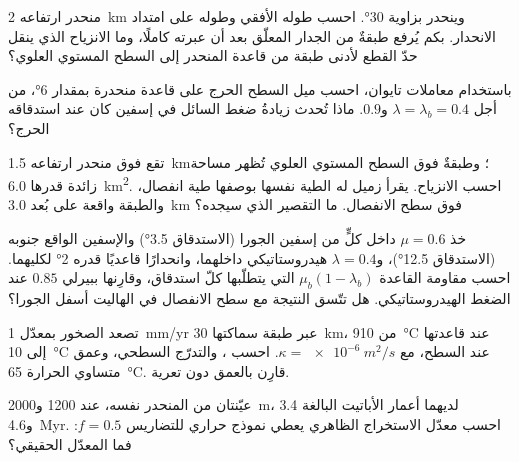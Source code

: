 \begin{exercise}[$\star$]\label{exo:b3:orogenic-wedges:4}
منحدر ارتفاعه \qty{2}{km} وينحدر بزاوية \ang{30}. احسب طوله الأفقي
وطوله على امتداد الانحدار. بكم يُرفع طبقةٌ من الجدار المعلّق بعد أن
عبرته كاملًا، وما الانزياح الذي ينقل حدّ القطع لأدنى
طبقة من قاعدة المنحدر إلى السطح المستوي العلوي؟
\end{exercise}

\begin{exercise}[$\star\star$]\label{exo:b3:orogenic-wedges:5}
باستخدام معاملات تايوان، احسب ميل السطح الحرج على قاعدة
منحدرة بمقدار \ang{6}، من أجل $\lambda = \lambda_b = 0.4$ و$0.9$. ماذا تُحدث
زيادةُ ضغط السائل في إسفين كان عند استدقاقه الحرج؟
\end{exercise}

\begin{exercise}[$\star\star$]\label{exo:b3:orogenic-wedges:6}
 تقع فوق منحدر ارتفاعه \qty{1.5}{km}؛ وطبقةٌ فوق
السطح المستوي العلوي تُظهر مساحة زائدة قدرها \qty{6.0}{km^2}. احسب الانزياح. يقرأ زميل له
الطية نفسها بوصفها طية انفصال، والطبقة واقعة على بُعد \qty{3.0}{km} فوق
سطح الانفصال. ما التقصير الذي سيجده؟
\end{exercise}

\begin{exercise}[$\star\star$]\label{exo:b3:orogenic-wedges:7}
خذ $\mu = 0.6$ داخل كلٍّ من إسفين الجورا (الاستدقاق \ang{3.5}) والإسفين الواقع
جنوبه (الاستدقاق \ang{12.5})، و$\lambda = 0.4$ هيدروستاتيكي داخلهما،
وانحدارًا قاعديًا قدره \ang{2} لكليهما. احسب مقاومة القاعدة $\mu_b(1 -
\lambda_b)$ التي يتطلّبها كلّ استدقاق، وقارِنها ببيرلي $0.85$ عند الضغط
الهيدروستاتيكي. هل تتّسق النتيجة مع سطح الانفصال في
الهاليت أسفل الجورا؟
\end{exercise}

\begin{exercise}[$\star\star$]\label{exo:b3:orogenic-wedges:8}
تصعد الصخور بمعدّل \qty{1}{mm/yr} عبر طبقة سماكتها \qty{30}{km}، من
\qty{910}{\celsius} عند قاعدتها إلى \qty{10}{\celsius} عند السطح، مع
$\kappa = \qty{e-6}{m^2/s}$. احسب ، والتدرّج السطحي،
وعمق متساوي الحرارة \qty{65}{\celsius}. قارِن بالعمق
دون تعرية.
\end{exercise}

\begin{exercise}[$\star\star$]\label{exo:b3:orogenic-wedges:9}
عيّنتان من المنحدر نفسه، عند 1200 و\qty{2000}{m}، لديهما أعمار الأباتيت
 البالغة 3.4 و\qty{4.6}{Myr}. احسب معدّل الاستخراج الظاهري
يعطي نموذج حراري للتضاريس $f = 0.5$: فما المعدّل الحقيقي؟
\end{exercise}

